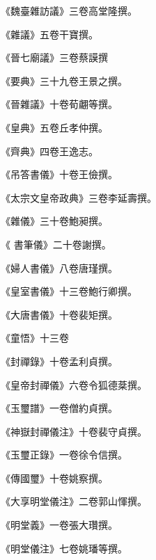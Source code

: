 \begin{pinyinscope}
 《魏臺雜訪議》三卷高堂隆撰。



 《雜議》五卷干寶撰。



 《晉七廟議》三卷蔡謨撰



 《要典》三十九卷王景之撰。



 《晉雜議》十卷荀翽等撰。



 《皇典》五卷丘孝仲撰。



 《齊典》四卷王逸志。



 《吊答書儀》十卷王儉撰。



 《太宗文皇帝政典》三卷李延壽撰。



 《雜儀》三十卷鮑昶撰。



 《
 書筆儀》二十卷謝撰。



 《婦人書儀》八卷唐瑾撰。



 《皇室書儀》十三卷鮑行卿撰。



 《大唐書儀》十卷裴矩撰。



 《童悟》十三卷



 《封禪錄》十卷孟利貞撰。



 《皇帝封禪儀》六卷令狐德棻撰。



 《玉璽譜》一卷僧約貞撰。



 《神嶽封禪儀注》十卷裴守貞撰。



 《玉璽正錄》一卷徐令信撰。



 《傳國璽》十卷姚察撰。



 《大享明堂儀注》二卷郭山惲撰。



 《明堂義》一卷張大瓚撰。



 《明堂儀注》七卷姚璠等撰。




\end{pinyinscope}
